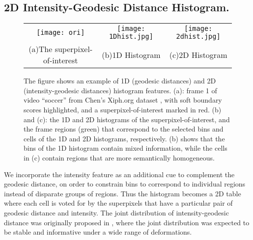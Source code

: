 \documentclass[runningheads]{llncs}
\begin{document}
\subsection{2D Intensity-Geodesic Distance Histogram.}  %
\begin{figure}[!t]
\begin{center}
\begin{tabular}{ccc}
\texttt{[image: ori]}&
\texttt{[image: 1Dhist.jpg]}&
\texttt{[image: 2dhist.jpg]}\\
(a)The superpixel-of-interest&(b)1D Histogram&(c)2D Histogram\\
\end{tabular}
\end{center}
\caption{The figure shows an example of 1D (geodesic distances) and 2D (intensity-geodesic distances) histogram features. (a): frame 1 of video ``soccer'' from Chen's Xiph.org dataset \cite{Chen_dataset}, with soft boundary scores highlighted, and a superpixel-of-interest marked in red. (b) and (c): the 1D and 2D histograms of the superpixel-of-interest, and the frame regions (green) that correspond to the selected bins and cells of the 1D and 2D histograms, respectively. (b) shows that the bins of the 1D histogram contain mixed information, while the cells in (c) contain regions that are more semantically homogeneous.}
\label{fig:main1}
\end{figure}
We incorporate the intensity feature as an additional cue  to complement the geodesic distance, on order to constrain bins to correspond to individual regions instead of disparate groups of regions. Thus the histogram becomes a 2D table where each cell is voted for by the superpixels that have a particular pair of geodesic distance and intensity. The joint distribution of  intensity-geodesic distance was originally proposed in \cite{geohis}, where the joint distribution was expected to be stable and informative under a wide range of deformations.
\end{document}

